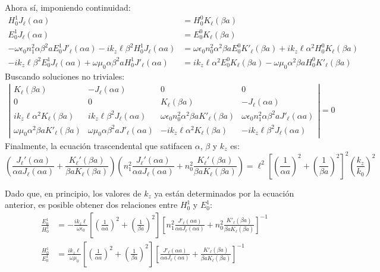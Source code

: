 Ahora sí, imponiendo continuidad:
\begin{align}
	H_0^{1} J_\ell(\alpha a) &= H_0^{0} K_\ell (\beta a)
	\label{eqn:cont1}
	\\
	E_0^{1} J_\ell(\alpha a) &= E_0^{0} K_\ell (\beta a)
	\label{eqn:cont2}
	 \\
	 -\omega \epsilon_0 n_1^2  \alpha\beta^2 a E_0^1 J'_\ell (\alpha a)-ik_z\ell \beta^2 H_0^1  J_\ell (\alpha a)
	 &= \omega \epsilon_0 n_0^2 \alpha^2 \beta a E_0^0 K'_\ell (\beta a)+ik_z\ell \alpha^2H_0^0  K_\ell (\beta a)
	 \label{eqn:cont3}
	 \\
	 -ik_z \ell \beta^2 E_0^1   J_\ell (\alpha a) + \omega \mu_0  \alpha \beta^2 a H_0^1  J'_\ell (\alpha a) &=
	 ik_z \ell \alpha^2 E_0^0   K_\ell (\beta a) -\omega \mu_0  \alpha^2 \beta a H_0^0  K'_\ell (\beta a)
	 \label{eqn:cont4}
\end{align}
Buscando soluciones no triviales:
\begin{align*}
	\left|\begin{matrix}
		K_\ell(\beta a) & -J_\ell(\alpha a) & 0 & 0
		\\
		0 & 0 & K_\ell(\beta a) & -J_\ell(\alpha a)
		\\
		ik_z\ell \alpha^2 K_\ell (\beta a) & ik_z\ell\beta^2 J_\ell (\alpha a) & \omega \epsilon_0 n_0^2  \alpha^2 \beta a K'_\ell (\beta a) & \omega \epsilon_0 n_1^2  \alpha \beta^2 a J'_\ell (\alpha a)
		\\
		\omega \mu_0  \alpha^2 \beta a   K'_\ell (\beta a) &  \omega \mu_0  \alpha \beta^2 a J'_\ell (\alpha a) & -ik_z \ell \alpha^2 K_\ell (\beta a) &  -ik_z \ell \beta^2  J_\ell (\alpha a)
	\end{matrix}\right|
	=
0
\end{align*}
Finalmente, la ecuación trascendental que satifacen $\alpha$, $\beta$ y $k_z$ es:
\begin{equation}
	\left( \frac{J_\ell'(\alpha a)}{\alpha a J_\ell(\alpha a)} + \frac{K_\ell'(\beta a)}{\beta a K_\ell(\beta a)} \right)\left( n_1^2\frac{J_\ell'(\alpha a)}{\alpha a J_\ell(\alpha a)} + n_0^2\frac{K_\ell'(\beta a)}{\beta a K_\ell(\beta a)} \right) = \ell^2 \left[ \left(\frac{1}{\alpha a}\right)^2 + \left(\frac{1}{\beta a}\right)^2 \right]^2 \left( \frac{k_z}{k_0} \right)^2 \label{eqn:fiber_trascendental}
\end{equation}

Dado que, en principio, los valores de $k_z$ ya están determinados por la ecuación anterior, es posible obtener dos relaciones entre $H_0^1$ y $E_0^1$:
\begin{align}
\frac{E_0^1}{H_0^1} &=  -\frac{i k_z \ell}{\omega\epsilon_0}\left[ \left(\frac{1}{\alpha a}\right)^2 + \left(\frac{1}{\beta a}\right)^2 \right]  \left[ n_1^2 \frac{J'_\ell(\alpha a)}{\alpha a J_\ell(\alpha a)} + n_0^2 \frac{K'_\ell(\beta a)}{\beta a K_\ell(\beta a)} \right]^{-1} \label{eqn:fiber_polarization_E}
\\
\frac{H_0^1}{E_0^1} &=  \frac{i k_z \ell}{ \omega\mu_0}\left[ \left(\frac{1}{\alpha a}\right)^2 + \left(\frac{1}{\beta a}\right)^2 \right]  \left[ \frac{J'_\ell(\alpha a)}{\alpha a J_\ell(\alpha a)} + \frac{K'_\ell(\beta a)}{\beta a K_\ell(\beta a)} \right]^{-1} \label{eqn:fiber_polarization_H}
\end{align}

